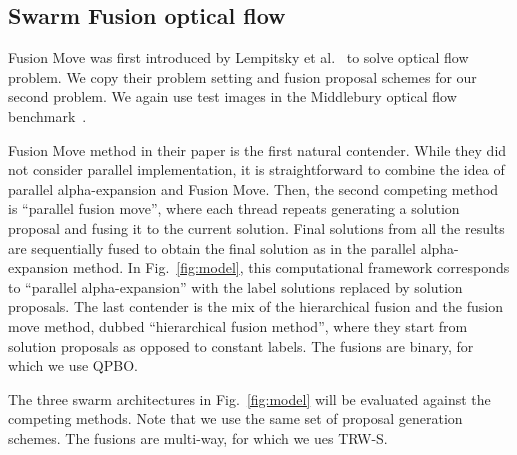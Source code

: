 \subsection{Swarm Fusion optical flow}

Fusion Move was first introduced by Lempitsky et al.~\cite{viktor} to
solve optical flow problem.
We copy their problem setting and fusion proposal schemes for our second
problem.  We again use test images in the Middlebury optical flow
benchmark~\cite{middlebury_optical_flow}.

 Fusion Move method in their paper is
the first natural contender. While they did not consider parallel
implementation, it is straightforward to combine the idea of parallel
alpha-expansion and Fusion Move. Then, the second competing method is
``parallel fusion move'', where each thread repeats generating a
solution proposal and fusing it to the current solution. Final solutions
from all the results are sequentially fused to obtain the final solution
as in the parallel alpha-expansion method. In Fig.~\ref{fig:model}, this
computational framework corresponds to ``parallel alpha-expansion'' with
the label solutions replaced by solution proposals. The last contender
is the mix of the hierarchical fusion and the fusion move method, dubbed
``hierarchical fusion method'', where they start from solution proposals
as opposed to constant labels.
%
The fusions are binary, for which we use QPBO.

The three swarm architectures in Fig.~\ref{fig:model} will be evaluated
against the competing methods. Note that we use the same set of proposal
generation schemes. The fusions are multi-way, for which we ues TRW-S.

